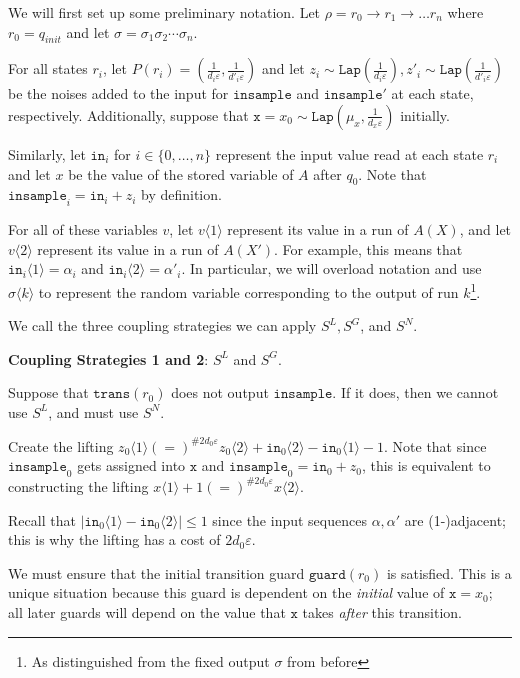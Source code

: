 \documentclass[12pt]{article}
\newcommand{\brangle}[1]{\langle #1 \rangle}
\newcommand{\guard}{\texttt{guard}}
\newcommand{\trans}{\texttt{trans}}
\newcommand{\Lap}{\texttt{Lap}}
\theoremstyle{definition}
\begin{document}
We will first set up some preliminary notation. Let $\rho = r_0\to r_1\to\ldots r_n$ where $r_0 = q_{init}$ and let $\sigma = \sigma_1\sigma_2\cdots\sigma_n$. 

For all states $r_i$, let $P(r_i) = (\frac{1}{d_i\varepsilon}, \frac{1}{d'_i\varepsilon})$ and let $z_i\sim \Lap(\frac{1}{d_i\varepsilon}), z'_i\sim \Lap(\frac{1}{d'_i\varepsilon})$ be the noises added to the input for $\texttt{insample}$ and $\texttt{insample}'$ at each state, respectively. Additionally, suppose that $\texttt{x} = x_0\sim \Lap(\mu_x, \frac{1}{d_x\varepsilon})$ initially.

Similarly, let $\texttt{in}_i$ for $i \in \{0,\ldots, n\}$ represent the input value read at each state $r_i$ and let $x$ be the value of the stored variable of $A$ after $q_0$. Note that $\texttt{insample}_i = \texttt{in}_i + z_i$ by definition.

For all of these variables $v$, let $v\brangle{1}$ represent its value in a run of $A(X)$, and let $v\brangle{2}$ represent its value in a run of $A(X')$. For example, this means that $\texttt{in}_i \brangle{1}= \alpha_i$ and $\texttt{in}_i\brangle{2} = \alpha'_i$. 
In particular, we will overload notation and use $\sigma\brangle{k}$ to represent the random variable corresponding to the output of run $k$\footnote{As distinguished from the fixed output $\sigma$ from before}.


We call the three coupling strategies we can apply $S^L, S^G$, and $S^N$. 

\textbf{Coupling Strategies 1 and 2}: $S^L$ and $S^G$. 

Suppose that $\trans(r_0)$ does not output $\texttt{insample}$. If it does, then we cannot use $S^L$, and must use $S^N$.

Create the lifting $z_0\brangle{1} (=)^{\#2d_0\varepsilon} z_0\brangle{2} + \texttt{in}_0\brangle{2}- \texttt{in}_0\brangle{1} - 1$. 
Note that since $\texttt{insample}_0$ gets assigned into $\texttt{x}$ and $\texttt{insample}_0 = \texttt{in}_0 + z_0$, this is equivalent to constructing the lifting $x\brangle{1} + 1 (=)^{\#2d_0\varepsilon}x\brangle{2}$. 

Recall that $|\texttt{in}_0\brangle{1}-\texttt{in}_0\brangle{2}|\leq 1$ since the input sequences $\alpha, \alpha'$ are (1-)adjacent; this is why the lifting has a cost of $2d_0\varepsilon$. 

We must ensure that the initial transition guard $\guard(r_0)$ is satisfied. This is a unique situation because this guard is dependent on the \textit{initial} value of $\texttt{x} = x_0$; all later guards will depend on the value that $\texttt{x}$ takes \textit{after} this transition. 
\end{document}
